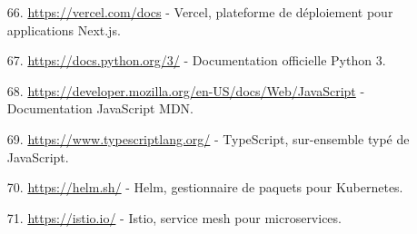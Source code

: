 \begin{itemize}[leftmargin=1cm, itemsep=0.3em, parsep=0.2em]
    \item[66.] \url{https://vercel.com/docs} - Vercel, plateforme de déploiement pour applications Next.js.
    \item[67.] \url{https://docs.python.org/3/} - Documentation officielle Python 3.
    \item[68.] \url{https://developer.mozilla.org/en-US/docs/Web/JavaScript} - Documentation JavaScript MDN.
    \item[69.] \url{https://www.typescriptlang.org/} - TypeScript, sur-ensemble typé de JavaScript.
    \item[70.] \url{https://helm.sh/} - Helm, gestionnaire de paquets pour Kubernetes.
    \item[71.] \url{https://istio.io/} - Istio, service mesh pour microservices.
\end{itemize}